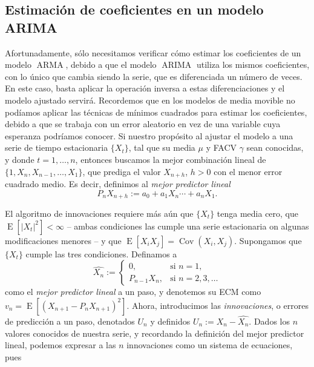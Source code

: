 \documentclass[11pt,letterpaper]{article}
\newcommand{\expected}{\ensuremath{\operatorname{E}}}
\newcommand{\covariance}{\ensuremath{\operatorname{Cov}}}
\newcommand{\ARMA}{\ensuremath{\operatorname{ARMA}}}
\newcommand{\ARIMA}{\ensuremath{\operatorname{ARIMA}}}
\theoremstyle{definition}
\theoremstyle{theorem}
\theoremstyle{remark}
\begin{document}
	\subsection{Estimación de coeficientes en un modelo ARIMA}
	\noindent Afortunadamente, sólo necesitamos verificar cómo estimar los coeficientes de un modelo \(\ARMA\), debido a que el modelo \(\ARIMA\) utiliza los mismos coeficientes, con lo único que cambia siendo la serie, que es diferenciada un número de veces. En este caso, basta aplicar la operación inversa a estas diferenciaciones y el modelo ajustado servirá. Recordemos que en los modelos de media movible no podíamos aplicar las técnicas de mínimos cuadrados para estimar los coeficientes, debido a que se trabaja con un error aleatorio en vez de una variable cuya esperanza podríamos conocer. Si nuestro propósito al ajustar el modelo a una serie de tiempo estacionaria \(\{X_t\}\), tal que su media \(\mu\) y FACV \(\gamma\) sean conocidas, y donde \(t=1,\dots,n\), entonces buscamos la mejor combinación lineal de \(\{1,X_n,X_{n-1},\dots,X_1\}\), que prediga el valor \(X_{n+h}\), \(h>0\) con el menor error cuadrado medio. Es decir, definimos al \textit{mejor predictor lineal}
	\[P_nX_{n+h}:=a_0+a_1X_n\cdots+a_nX_1.\]
	\par El algoritmo de innovaciones requiere más aún que \(\{X_t\}\) tenga media cero, que \(\expected[|X_t|^2]<\infty\) -- ambas condiciones las cumple una serie estacionaria on algunas modificaciones menores -- y que \(\expected[X_iX_j]=\covariance(X_i,X_j)\). Supongamos que \(\{X_t\}\) cumple las tres condiciones. Definamos a
	\[\hat{X_n}:=\begin{cases}0,&\mbox{si }n=1,\\P_{n-1}X_n,&\mbox{si }n=2,3,\dots\end{cases}\]
	como el \textit{mejor predictor lineal} a un paso, y denotemos su ECM como \(v_n=\expected\left[(X_{n+1}-P_nX_{n+1})^2\right]\). Ahora, introducimos las \textit{innovaciones}, o errores de predicción a un paso, denotados \(U_n\) y definidos \(U_n:=X_n-\hat{X_n}\). Dados los \(n\) valores conocidos de nuestra serie, y recordando la definición del mejor predictor lineal, podemos expresar a las \(n\) innovaciones como un sistema de ecuaciones, pues
\end{document}
